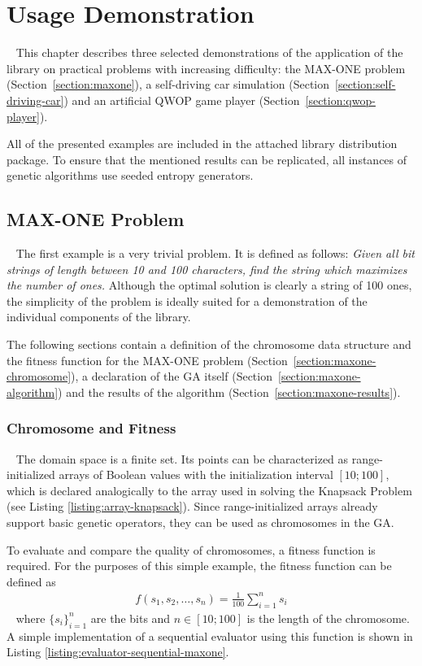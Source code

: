\chapter{Usage Demonstration}~\label{chapter:usage-demo}
This chapter describes three selected demonstrations of the application of the library on practical problems with increasing difficulty: the MAX-ONE problem (Section~\ref{section:maxone}), a self-driving car simulation (Section~\ref{section:self-driving-car}) and an artificial QWOP game player (Section~\ref{section:qwop-player}).

All of the presented examples are included in the attached library distribution package. To ensure that the mentioned results can be replicated, all instances of genetic algorithms use seeded entropy generators.

\section{MAX-ONE Problem}~\label{section:maxone}
The first example is a very trivial problem. It is defined as follows: \textit{Given all bit strings of length between 10 and 100 characters, find the string which maximizes the number of ones.} Although the optimal solution is clearly a string of 100 ones, the simplicity of the problem is ideally suited for a demonstration of the individual components of the library.

The following sections contain a definition of the chromosome data structure and the fitness function for the MAX-ONE problem (Section~\ref{section:maxone-chromosome}), a declaration of the GA itself (Section~\ref{section:maxone-algorithm}) and the results of the algorithm (Section~\ref{section:maxone-results}).

\subsection{Chromosome and Fitness}~\label{section:maxone-chromosome}
The domain space is a finite set. Its points can be characterized as range-initialized arrays of Boolean values with the initialization interval $[10;100]$, which is declared analogically to the array used in solving the Knapsack Problem (see Listing \ref{listing:array-knapsack}). Since range-initialized arrays already support basic genetic operators, they can be used as chromosomes in the GA.

To evaluate and compare the quality of chromosomes, a fitness function is required. For the purposes of this simple example, the fitness function can be defined as
~
\begin{align}
	f(s_1, s_2, \dots, s_{n}) = \frac{1}{100}\sum_{i=1}^{n} s_i
\end{align}
~
where $\{s_i\}_{i=1}^{n}$ are the bits and $n\in[10;100]$ is the length of the chromosome. A simple implementation of a sequential evaluator using this function is shown in Listing \ref{listing:evaluator-sequential-maxone}.

